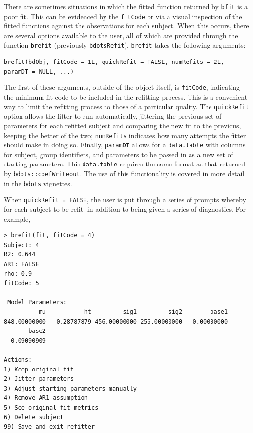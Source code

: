 \documentclass{article}
\newcommand{\xt}{\texttt}%
\begin{document}
There are sometimes situations in which the fitted function returned by \texttt{bfit} is a poor fit. This can be evidenced by the \texttt{fitCode} or via a visual inspection of the fitted functions against the observations for each subject.  When this occurs, there are several options available to the user, all of which are provided through the function \texttt{brefit} (previously \texttt{bdotsRefit}). \texttt{brefit} takes the following arguments:

\begin{center}
\texttt{brefit(bdObj, fitCode = 1L, quickRefit = FALSE, numRefits = 2L, paramDT = NULL, ...)}
\end{center}

The first of these arguments, outside of the object itself, is \texttt{fitCode}, indicating  the minimum fit code to be included in the refitting process. This is a convenient way to limit the refitting process to those of a particular quality. The \texttt{quickRefit} option allows the fitter to run automatically, jittering the previous set of parameters for each refitted subject and comparing the new fit to the previous, keeping the better of the two; \texttt{numRefits} indicates how many attempts the fitter should make in doing so. Finally, \texttt{paramDT} allows for a \texttt{data.table} with columns for subject, group identifiers, and parameters to be passed in as a new set of starting parameters. This \texttt{data.table} requires the same format as that returned by \texttt{bdots::coefWriteout}. The use of this functionality is covered in more detail in the \xt{bdots} vignettes.

When \texttt{quickRefit = FALSE}, the user is put through a series of prompts whereby for each subject to be refit, in addition to being given a series of diagnostics. For example, 

\begin{singlespace}
\begin{verbatim}
> brefit(fit, fitCode = 4)
Subject: 4
R2: 0.644
AR1: FALSE
rho: 0.9
fitCode: 5

 Model Parameters:
          mu           ht         sig1         sig2        base1 
848.00000000   0.28787879 456.00000000 256.00000000   0.00000000 
       base2 
  0.09090909 

Actions:
1) Keep original fit
2) Jitter parameters
3) Adjust starting parameters manually
4) Remove AR1 assumption
5) See original fit metrics
6) Delete subject
99) Save and exit refitter
\end{verbatim}
\end{singlespace}
\end{document}
